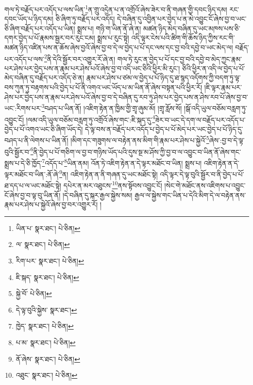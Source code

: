 གལ་ཏེ་བརྗོད་པར་འདོད་པ་ལས་ཡིན་\footnote{ཡིན་པ་  སྣར་ཐང་།  པེ་ཅིན། }ན་གྲུ་འདྲེན་པ་ན་འགྲོའོ་ཞེས་ཟེར་བ་ནི་གཞན་གྱི་དབང་ཉིད་དམ། རང་དབང་ཡོད་པ་ཉིད་དམ། ཅི་ཞིག་ཏུ་བརྗོད་པར་འདོད། དེ་བཞིན་དུ་འབྱིན་པར་བྱེད་པ་ན་མེ་འབྱུང་ངོ་ཞེས་བྱ་བ་ཡང་ཅི་ཞིག་བརྗོད་པར་འདོད་པ་ཡིན། སྨྲས་པ། གཉི་ག་ཡིན་ནོ་ཞེ་ན། མཚན་ཉིད་མེད་བཞིན་དུ་ཡང་མཁས་པས་ཅི་དགར་བྱེད་པ་པོ་རྣམས་སྦྱར་བར་རུང་ངམ། སྨྲས་པ་རུང་སྟེ། འདི་ལྟར་ངེས་པའི་ཚིག་གི་ཆོས་ཉིད་ཀྱིས་རང་གི་མཚན་ཉིད་འཛིན་པས་ན་ཆོས་ཞེས་བྱའོ་ཞེས་བྱ་བ་དེ་ལ་བྱེད་པ་པོ་དང་ལས་དང་བྱ་བའི་དབྱེ་བ་ཡང་མེད་ལ། བརྗོད་པར་འདོད་པ་ལས་\footnote{ལ་  སྣར་ཐང་།  པེ་ཅིན། }ནི་དེའི་སྦྱོར་བར་འགྱུར་རོ་ཞེ་ན། གལ་ཏེ་རུང་ན་བྱེད་པ་པོ་དང་བྱ་བའི་དབྱེ་བ་མེད་ཀྱང་རྣམ་པར་ཤེས་པར་བྱེད་པས་ན་རྣམ་པར་ཤེས་པའོ་ཞེས་བྱ་བ་འདི་ཡང་ཅིའི་ཕྱིར་མི་རུང་། ཅིའི་ཕྱིར་ན་འདི་ལ་བྱེད་པ་པོ་མེད་བཞིན་དུ་བརྗོད་པར་འདོད་ཅེ་ན། རྣམ་པར་ཤེས་པ་ཙམ་ལ་བྱེད་པ་པོ་ཉིད་དུ་ཐ་སྙད་འདོགས་ཀྱི་བདག་ཏུ་ལྟ་བས་ཀུན་ཏུ་བརྟགས་པའི་བྱེད་པ་པོ་ནི་འགའ་ཡང་ཡོད་པ་མ་ཡིན་ནོ་ཞེས་བསྟན་པའི་ཕྱིར་རོ། །ཇི་ལྟར་རྣམ་པར་ཤེས་པར་བྱེད་པས་ན་རྣམ་པར་ཤེས་པའོ་ཞེས་བྱ་བ་དེ་བཞིན་དུ་རབ་ཏུ་ཤེས་པར་བྱེད་པས་ན་ཤེས་རབ་པོ་ཞེས་བྱ་བ་ཡང་:རིགས་པར་\footnote{རིག་པར་  སྣར་ཐང་།  པེ་ཅིན། }བཤད་པ་ཡིན་ནོ། །འཇིག་རྟེན་ན་ཁྱིམ་གྱི་གྲྭ་ཞུམ་མོ། །གྲྭ་རློས་སོ། །སྒོ་འདི་ཡུལ་བཅོམ་བརླག་ཏུ་འབྱུང་ངོ། །ལམ་འདི་ཡུལ་བཅོམ་བརླག་ཏུ་འགྲོའོ་ཞེས་གང་:ཇི་སྐད་དུ་\footnote{ཇི་སྐད་  སྣར་ཐང་།  པེ་ཅིན། }ཟེར་བ་ཡང་དེ་དག་ལ་བརྗོད་པར་འདོད་པ་བྱེད་པ་པོ་འགའ་ཡང་ཅི་ཞིག་ཡོད་དེ། དེ་ལྟ་བས་ན་བརྗོད་པར་འདོད་པ་བྱེད་པ་པོ་མེད་པར་ཡང་བྱེད་པ་པོ་ཉིད་དུ་བཤད་པ་ནི་ལེགས་པ་ཡིན་ནོ། །མིག་དང་གཟུགས་ལ་བརྟེན་ནས་མིག་གི་རྣམ་པར་ཤེས་པ་སྐྱེའོ་\footnote{སྐྱེ་བོ་  པེ་ཅིན། }ཞེས་:བྱ་བ་དེ་ལྟ་བུའི་སྦྱོར་བ་\footnote{དེ་ལྟ་བུའི་སྐྱེས་  སྣར་ཐང་། }ནི་བྱེད་པ་པོ་གཅིག་ལ་བྱ་བ་གཉིས་ཡོད་པའི་དུས་སྔ་མ་ཤོས་ཀྱི་བྱ་བ་ལ་འབྱུང་བ་ཡིན་ནོ་ཞེས་གང་སྨྲས་པ་དེ་ཅི་ཁྱོད་\footnote{ཁྱེད་  སྣར་ཐང་།  པེ་ཅིན། }འདོད་པ་\footnote{པ་མ་  སྣར་ཐང་།  པེ་ཅིན། }ཡིན་ནམ། འོན་ཏེ་འཇིག་རྟེན་ན་དེ་ལྟར་མཐོང་བ་ཡིན། སྨྲས་པ། འཇིག་རྟེན་ན་དེ་ལྟར་མཐོང་བ་ཡིན་:ནོ་ཞེ་\footnote{ནོ་ཞེས་  སྣར་ཐང་།  པེ་ཅིན། }ན། འཇིག་རྟེན་ན་ནི་གཞན་དུ་ཡང་མཐོང་སྟེ། འདི་ལྟར་དེ་ལྟ་བུའི་སྦྱོར་བ་ནི་བྱེད་པ་པོ་ཐ་དད་པ་ལ་ཡང་མཐོང་སྟེ། དཔེར་ན་མར་འཐུངས་\footnote{འཐུང་  སྣར་ཐང་།  པེ་ཅིན། }ནས་སྟོབས་འབྱུང་ངོ། །སེང་གེ་མཐོང་ནས་འཇིགས་པ་འབྱུང་ངོ་ཞེས་བྱ་བ་ལྟ་བུ་ཡིན་ནོ། །དེ་བཞིན་དུ་སྐར་རྒྱལ་སྐྱེས་སམ། རྒྱལ་ལ་སྐྱེས་གང་ཡིན་པ་དེའི་མིག་དེ་ལ་བརྟེན་ནས་རྣམ་པར་ཤེས་པ་སྐྱེའོ་ཞེས་བྱ་བར་འགྱུར་རོ། །
